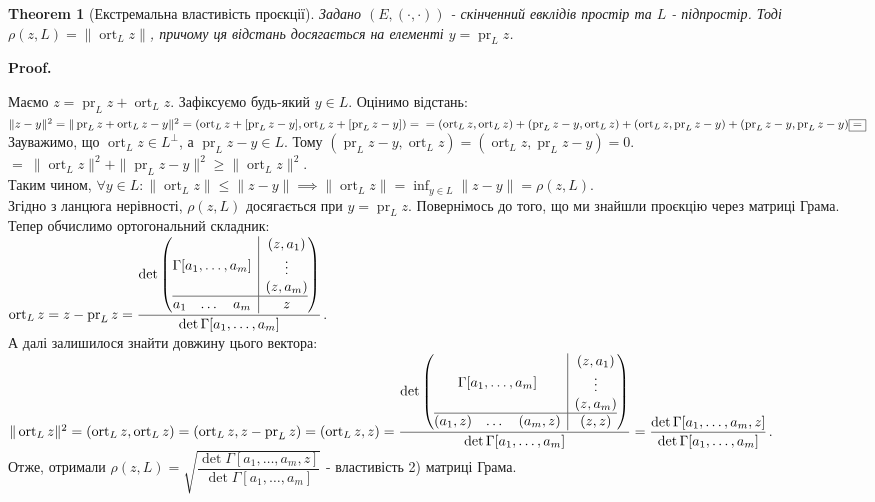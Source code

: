 \documentclass[a4paper, 10pt]{article}
\makeatletter
\theoremstyle{theoremdd}
\newtheorem{theorem}{Theorem}[subsection]
\DeclareMathOperator{\ort}{ort}
\DeclareMathOperator{\pr}{pr}
\renewenvironment{proof}[1][Proof.\\]{\par
\pushQED{\hfill \qed}%
\normalfont \topsep6\p@\@plus6\p@\relax
\trivlist
\item\relax
{\bfseries
#1\@addpunct{.}}\hspace\labelsep\ignorespaces
}{%
\popQED\endtrivlist\@endpefalse
}
\makeatother
\begin{document}
\begin{theorem}[Екстремальна властивість проєкції]
Задано $(E,(\cdot,\cdot))$ - скінченний евклідів простір та $L$ - підпростір. Тоді $\rho(z,L) = \| \ort_L z \|$, причому ця відстань досягається на елементі $y = \pr_L z$.
\end{theorem}

\begin{proof}
Маємо $z = \pr_L z + \ort_L z$. Зафіксуємо будь-який $y \in L$. Оцінимо відстань:\\
$\|z-y\|^2 = \|\pr_L z + \ort_L z - y\|^2 = (\ort_L z + [\pr_L z - y], \ort_L z + [\pr_L z - y]) = \\ = (\ort_L z, \ort_L z) + (\pr_L z - y,\ort_L z) + (\ort_L z,\pr_L z - y) + (\pr_L z-y, \pr_L z-y) \boxed{=}$\\
Зауважимо, що $\ort_L z \in L^\perp$, а $\pr_L z - y \in L$. Тому $(\pr_L z-y,\ort_L z) = (\ort_L z, \pr_L z -y) = 0$.\\
$\boxed{=} \ \|\ort_L z\|^2 + \|\pr_L z - y\|^2 \geq \|\ort_L z\|^2$.\\
Таким чином, $\forall y \in L: \|\ort_L z\| \leq \|z-y\| \implies \|\ort_L z\| = \displaystyle\inf_{y \in L} \|z-y\| = \rho(z,L)$.\\
Згідно з ланцюга нерівності, $\rho (z,L)$ досягається при $y = \pr_L z$.
\end{proof}
\noindent
Повернімось до того, що ми знайшли проєкцію через матриці Грама. Тепер обчислимо ортогональний складник: \\
$\ort_L z = z - \pr_L z = \dfrac{\det \left(\begin{array}{@{}c|c@{}}
\Gamma[a_1,\dots,a_m] & \begin{matrix} (z,a_1) \\ \vdots \\ (z,a_m) \end{matrix} \\
\hline
\begin{matrix} a_1 & \dots & a_m \end{matrix} & z
\end{array}\right)}{\det\Gamma[a_1,\dots,a_m]}$.\\
А далі залишилося знайти довжину цього вектора:\\
$\| \ort_L z\|^2 = (\ort_L z, \ort_L z) = (\ort_L z, z - \pr_L z) = (\ort_L z, z)= \dfrac{\det \left(\begin{array}{@{}c|c@{}}
\Gamma[a_1,\dots,a_m] & \begin{matrix} (z,a_1) \\ \vdots \\ (z,a_m) \end{matrix} \\
\hline
\begin{matrix} (a_1,z) & \dots & (a_m,z) \end{matrix} & (z,z)
\end{array}\right)}{\det\Gamma[a_1,\dots,a_m]} = \dfrac{\det\Gamma[a_1,\dots,a_m,z]}{\det\Gamma[a_1,\dots,a_m]}$.\\
Отже, отримали $\rho(z,L) = \sqrt{\dfrac{\det\Gamma[a_1,\dots,a_m,z]}{\det\Gamma[a_1,\dots,a_m]}}$ - властивість 2) матриці Грама.
\end{document}
